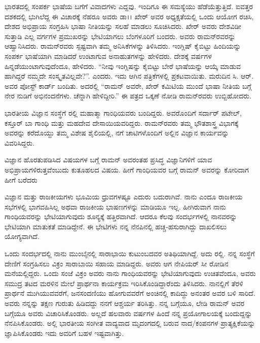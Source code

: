 ಭಾರತದಲ್ಲಿ ಸಂಪರ್ಕ ಭಾಷೆಯ ಬಗೆಗೆ ವಿವಾದಗಳು ಎದ್ದವು. ಇಂದಿಗೂ ಈ ಸಮಸ್ಯೆಯು ಹೆಡೆಯೆತ್ತುತ್ತಿದೆ. ಐವತ್ತರ ದಶಕದಲ್ಲಿ ಭುಗಿಲೆದ್ದ ಈ ವಿಚಾರಕ್ಕೆ ನೆಹರೂ ಅವರು ಡಾ।। ಖೇರ್ ಅವರ ಅಧ್ಯಕ್ಷತೆಯಲ್ಲಿ ಒಂದು ಆಯೋಗ ರಚಿಸಿ, ದೇಶದ ಅಭಿಪ್ರಾಯ ಸಂಗ್ರಹಿಸಿ ಭಾಷಾ ನೀತಿಯನ್ನು ಸಲಹೆ ಮಾಡಲು ಸೂಚಿಸಿದರು. ಖೇರ್ ಅವರು ದೇಶವಿಡೀ ಸುತ್ತಾಡಿ ಎಲ್ಲ ವರ್ಗಗಳ ಪ್ರಮುಖರನ್ನು ಭೇಟಿಯಾಗಲು ಬೆಂಗಳೂರಿಗೆ ಬಂದರು. ಅವರು ರಾಮನ್‍ರವರನ್ನು ಆಹ್ವಾನಿಸಿದರು. ರಾಮನ್‍ರವರು ಸ್ಪಷ್ಟವಾಗಿ ತಮ್ಮ ಅನಿಸಿಕೆಗಳನ್ನು ತಿಳಿಸಿದರು. ಇಂಗ್ಲಿಷ್ ಕೈಬಿಟ್ಟು ಹಿಂದಿಯನ್ನು ಸಂಪರ್ಕ ಭಾಷೆಯಾಗಿ ಮಾಡಿದರೆ ಉಂಟಾಗುವ ಅನಾಹುತಗಳನ್ನು ಹೇಳಿದರು. ದೇಶಕ್ಕೆ  ವರ್ಷಗಳ ಹಿನ್ನಡೆಯುಂಟಾಗುವುದೆಂದೂ, ಹೇಳಿದರು. “ನೀವು ಇಂಗ್ಲಿಷನ್ನು ಕೈಬಿಟ್ಟು ಬೇರೆ ಭಾಷೆಯನ್ನು ಆಯ್ಕೆ ಮಾಡುವ ಹಾಗಿದ್ದರೆ ನಮ್ಮದೇ ಸಂಸ್ಕೃತವಿಲ್ಲವೇ?”. ಎಂದರು. ಇದು ಆಗಿನ ಪತ್ರಿಕೆಗಳಲ್ಲಿ ಪ್ರಕಟವಾಯಿತು. ಮರುದಿನ ಸಿ. ಆರ್. ಅವರ ಪೋಸ್ಟ್ ಕಾರ್ಡ್ ಬಂದಿತು. ಅದರಲ್ಲಿ “ರಾಮನ್ ಅವರೇ, ಖೇರ್ ಕಮಿಟಿಯ ಮುಂದೆ ಭಾಷಾ ನೀತಿಯ ಬಗ್ಗೆ ನೇರ ನುಡಿಗೆ ಅಭಿನಂದನೆಗಳು. ಚೆನ್ನಾಗಿ ಹೇಳಿದ್ದೀರಿ.” ಈ ಪತ್ರದ ಒಕ್ಕಣೆ ನೋಡಿ ರಾಮನ್‍ರವರು ಉಬ್ಬಿಹೋದರು.



\vskip 3pt

ಭಾರತೀಯ ವಿಜ್ಞಾನ ಸಂಸ್ಥೆಗೆ ರಲ್ಲಿ ಮಹಾತ್ಮಾ ಗಾಂಧಿಯವರು ಬಂದಿದ್ದರು. ಅವರೊಂದಿಗೆ ಸರ್ದಾರ್ ಪಟೇಲ್, ಕಸ್ತೂರ್ ಬಾ ಗಾಂಧಿ ಮತ್ತು ಮಹದೇವ ದೇಸಾಯಿಯವರಿದ್ದರು. ರಾಮನ್‍\-ರವರು ತಮ್ಮ ಭೌತಶಾಸ್ತ್ರ ವಿಭಾಗಕ್ಕೆ ಅವರನ್ನು ಕರೆದೊಯ್ದು ತಮ್ಮ ವಿಶೇಷ ಶೈಲಿಯಲ್ಲಿ, ನಗೆ ಚಾಟಿಗಳೊಂದಿಗೆ ಅಲ್ಲಿನ ವಿಜ್ಞಾನ ಕಾರ್ಯವನ್ನು ವಿವರಿಸಿದ್ದರು.

\vskip 2pt

ವಿಜ್ಞಾನ ಹೊರತುಪಡಿಸಿದ ವಿಷಯಗಳ ಬಗ್ಗೆ ರಾಮನ್ ಅವರಂತಹ ಪ್ರಸಿದ್ಧ ವಿಜ್ಞಾನಿಗಳಿಗೆ ಯಾವ ಅಭಿಪ್ರಾಯಗಳಿರುತ್ತವೆಂಬುದು ಕುತೂಹಲದ ವಿಷಯ. ಹೀಗೆ ಗಾಂಧಿಯವರ ಬಗ್ಗೆ ರಾಮನ್ ಅವರನ್ನು ಕೋರಿದಾಗ ಹೀಗೆ ಬರೆದರು\enginline{--}

\vskip 2pt

ವಿಜ್ಞಾನ ಮತ್ತು ರಾಜಕೀಯಗಳು ಭೂಮಿಯ ಧ್ರುವಗಳಷ್ಟೂ ಎದುರು ಬದುರಾಗಿವೆ. ನಾನು ಎಂದೂ ರಾಜಕೀಯ ಸಭೆಗಳಲ್ಲಿ ಭಾಗವಹಿಸಿಲ್ಲ ಅಥವಾ ರಾಜಕೀಯ ಭಾಷಣಗಳನ್ನು ಮಾಡಿಯೂ ಇಲ್ಲ. ಹೀಗಿರುವಾಗ ನಾನು ಗಾಂಧಿಯವರನ್ನು ಭೇಟಿಯಾಗುವುದು ಶೂನ್ಯಕ್ಕೆ ಹತ್ತಿರವಾಗಿದೆ. ಆದರೂ ಕೆಲವು ಸಂದರ್ಭಗಳಲ್ಲಿ ನಾನವರನ್ನು ಭೇಟಿಯಾಗಿ ಮಾತುಕತೆ ಮಾಡಿದ್ದೇನೆ. ಈ ಭೇಟಿಗಳು ನನ್ನ ನೆನಪಿನಲ್ಲಿ ಹಚ್ಚ-ಹಸುರಾಗಿದ್ದು ದಾಖಲಿಸಲು ಯೋಗ್ಯವಾಗಿದೆ.

\vskip 2pt

ಒಂದು ಸಂದರ್ಭದಲ್ಲಿ ನಾನು ಮುಂಬೈನಲ್ಲಿ ಸಾರಾಭಾಯಿ ಕುಟುಂಬದವರ ಅತಿಥಿಯಾಗಿದ್ದೆ. ಅದು ರಲ್ಲಿ. ನನ್ನ ಸಂಸ್ಥೆಗೆ ದೇಣಿಗೆ ಸಂಗ್ರಹಿಸಲು ವಿಕ್ರಂ ಸಾರಾಬಾಯಿ ಸಹಾಯ ಮಾಡಿದ್ದರು. ಅವರು ಆಗ ನೇಪಿಯರ್ ಸೀ ರೋಡಿನ ಮನೆಯಲ್ಲಿದ್ದರು. ಒಂದು ಸಂಜೆ ವಿಕ್ರಂ ಅವರು ನಾನು ಗಾಂಧಿಯವರನ್ನು ಭೇಟಿಯಾಗುವುದು ಉಚಿತವೆಂದೂ, ಅವರು ಸಮುದ್ರ ತಟದ ಮರಳಿನ ಮೇಲೆ ಪ್ರಾರ್ಥನಾ ಕಾರ್ಯಕ್ರಮ ಇರಿಸಿಕೊಂಡಿದ್ದಾರೆಂದು ತಿಳಿಸಿದರು. ನಾನಲ್ಲಿಗೆ ತೆರಳಿ ಪ್ರಾರ್ಥನೆ ಮುಗಿಯುವವರೆಗೆ, ಜನಸಂದಣಿಯು ಹೋಗುವವರೆಗೆ ಅಂಚಿನಲ್ಲಿ ಕಾದಿದ್ದು ಅನಂತರ ಅವರ ಬಳಿ ಸಾರಿದೆ. ಅವರು ನನ್ನನ್ನು ತಕ್ಷಣ ಗುರುತು ಹಿಡಿದದ್ದು ನನಗೆ ಆಶ್ಚರ್ಯ ತರಿಸಿತ್ತು. ನನ್ನ ಬಗ್ಗೆಯೂ, ಲೇಡಿ ರಾಮನ್ ಅವರ ಬಗ್ಗೆಯೂ ಅವರು ವಿಚಾರಿಸಿಕೊಂಡರು. ಅಲ್ಲದೆ ಹಲವಾರು ವರ್ಷಗಳ ಹಿಂದೆ ನನ್ನ ಪ್ರಯೋಗಾಲಯಕ್ಕೆ ಬಂದುದ್ದನ್ನು ನೆನಪಿಸಿಕೊಂಡರು. ಅಲ್ಲಿ ಭಾರತೀಯ ಸಂಗೀತ ವಾದ್ಯವಾದ ಮೃದಂಗದಲ್ಲಿ ಬರುವ ನಾದ/ಕಂಪನಗಳ ಪ್ರಾತ್ಯಕ್ಷಿಕೆಯನ್ನು ಜ್ಞಾಪಿಸಿಕೊಂಡರು ಇದು ಅವರಿಗೆ ಬಹಳ ಇಷ್ಟವಾಗಿತ್ತು.

